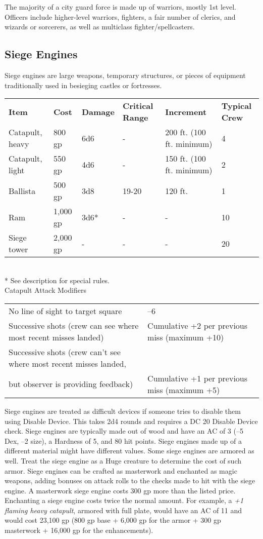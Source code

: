 The majority of a city guard force is made up of warriors, mostly 1st level. Officers include higher-level warriors, fighters, a fair number of clerics, and wizards or sorcerers, as well as multiclass fighter/spellcasters.
				
\subsection{Siege Engines}
Siege engines are large weapons, temporary structures, or pieces of equipment traditionally used in besieging castles or fortresses.

\begin{table*}[]
\sffamily
\caption{Siege Engines}
\begin{tabular}{llllll}
\textbf{Item} & \textbf{Cost} & \textbf{Damage} & \textbf{Critical Range} & \textbf{Increment} & \textbf{Typical Crew}\\
Catapult, heavy & 800 gp & 6d6 & - & 200 ft. (100 ft. minimum) & 4\\
Catapult, light & 550 gp & 4d6 & - & 150 ft. (100 ft. minimum) & 2\\
Ballista & 500 gp & 3d8 & 19-20 & 120 ft. & 1\\
Ram & 1,000 gp & 3d6* & - & - & 10\\
Siege tower & 2,000 gp & - & - & - & 20\\
\end{tabular}\\
* See description for special rules.\\
\textnormal{Catapult Attack Modifiers}\\
 \begin{tabular}{ll}
No line of sight to target square & --6\\
Successive shots (crew can see where most recent misses landed) & Cumulative +2 per previous miss (maximum +10)\\
Successive shots (crew can't see where most recent misses landed, & \\
but observer is providing feedback) & Cumulative +1 per previous miss (maximum +5)\\
 \end{tabular}
\end{table*}

				
Siege engines are treated as difficult devices if someone tries to disable them using Disable Device. This takes 2d4 rounds and requires a DC 20 Disable Device check. Siege engines are typically made out of wood and have an AC of 3 (--5 Dex, --2 size), a Hardness of 5, and 80 hit points. Siege engines made up of a different material might have different values. Some siege engines are armored as well. Treat the siege engine as a Huge creature to determine the cost of such armor. Siege engines can be crafted as masterwork and enchanted as magic weapons, adding bonuses on attack rolls to the checks made to hit with the siege engine. A masterwork siege engine costs 300 gp more than the listed price. Enchanting a siege engine costs twice the normal amount. For example, a \textit{+1 flaming heavy catapult}, armored with full plate, would have an AC of 11 and would cost 23,100 gp (800 gp base + 6,000 gp for the armor + 300 gp masterwork + 16,000 gp for the enhancements).
				
